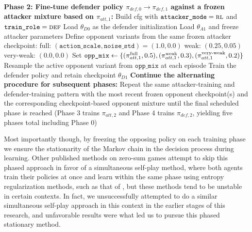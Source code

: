 \begin{algorithm}[H]
\begin{algorithmic}[1]
\State \textbf{Phase 2: Fine-tune defender policy $\pi_{def,0}\!\rightarrow\!\pi_{def,1}$ against a frozen attacker mixture based on $\pi_{att,1}$:}
\State \hspace{1em} Build cfg with $\texttt{attacker\_mode}=\textsc{rl}$ and $\texttt{train\_role}=\textsc{def}$
\State \hspace{1em} Load $\theta_{D0}$ as the defender initialization
\State \hspace{1em} Load $\theta_{A1}$ and freeze attacker parameters
\State \hspace{1em} Define opponent variants from the same frozen attacker checkpoint:
\Statex \hspace{2em} full: $(\texttt{action\_scale},\texttt{noise\_std})=(1.0,0.0)$
\Statex \hspace{2em} weak: $(0.25,0.05)$
\Statex \hspace{2em} very-weak: $(0.0,0.0)$
\State \hspace{1em} Set
\Statex \hspace{2em}
$\texttt{opp\_mix}\gets\{(\pi_{att,1}^{\text{full}},0.5),(\pi_{att,1}^{\text{weak}},0.3),(\pi_{att,1}^{\text{very\mbox{-}weak}},0.2)\}$
\State \hspace{1em} Resample the active opponent variant from $\texttt{opp\_mix}$ at each episode
\State \hspace{1em} Train the defender policy and retain checkpoint $\theta_{D1}$
\State \textbf{Continue the alternating procedure for subsequent phases:}
\State \hspace{1em} Repeat the same attacker-training and defender-training pattern with the most recent frozen opponent checkpoint(s) and the corresponding checkpoint-based opponent mixture until the final scheduled phase is reached (Phase 3 trains $\pi_{att,2}$ and Phase 4 trains $\pi_{def,2}$, yielding five phases total including Phase 0)
\end{algorithmic}
\end{algorithm}


Most importantly though, by freezing the opposing policy on each training phase we ensure the stationarity of the Markov chain in the decision process during learning. Other published methods on zero-sum games attempt to skip this phased approach in favor of a simultaneous self-play method, where both agents train their policies at once and learn within the same phase using entropy regularization methods, such as that of \cite{rudolph2025reevaluating}, but these methods tend to be unstable in certain contexts. In fact, we unsuccessfully attempted to do a similar simultaneous self-play approach in this context in the earlier stages of this research, and unfavorable results were what led us to pursue this phased stationary method.

